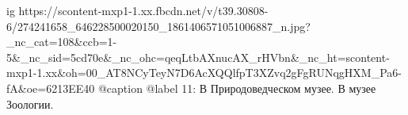  
 
 
 
 

\ifcmt
  ig https://scontent-mxp1-1.xx.fbcdn.net/v/t39.30808-6/274241658_646228500020150_1861406571051006887_n.jpg?_nc_cat=108&ccb=1-5&_nc_sid=5cd70e&_nc_ohc=qeqLtbAXnucAX_rHVbn&_nc_ht=scontent-mxp1-1.xx&oh=00_AT8NCyTeyN7D6AcXQQlfpT3XZvq2gFgRUNqgHXM_Pa6-fA&oe=6213EE40
  @caption @label 11: В Природоведческом музее. В музее Зоологии.
\fi
